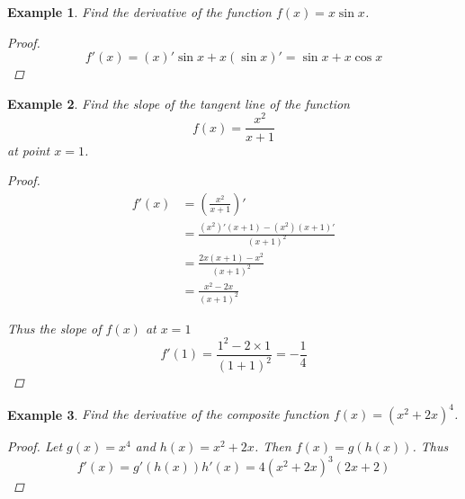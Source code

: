\documentclass{article}
\newtheorem{ex}{Example}
\begin{document}
\begin{ex}
	Find the derivative of the function $f(x) = x\sin x$.
	
	\begin{proof}
		\[ f'(x) = (x)'\sin x + x(\sin x)' = \sin x + x\cos x \]
	\end{proof}
\end{ex}

\begin{ex}
	Find the slope of the tangent line of the function 
	\[ f(x) = \frac{x^2}{x+1} \]
	at point $x=1$.
	
	\begin{proof}
		\begin{align*}
		f'(x) &= \left(\frac{x^2}{x+1}\right)'\\
		&= \frac{(x^2)'(x+1)-(x^2)(x+1)'}{(x+1)^2}\\
		&= \frac{2x(x+1)-x^2}{(x+1)^2}\\
		&= \frac{x^2 - 2x}{(x+1)^2}
		\end{align*}
		
		Thus the slope of $f(x)$ at $x=1$
		\[ f'(1) = \frac{1^2 -2\times1}{(1+1)^2} = -\frac{1}{4} \]
	\end{proof}	
\end{ex}


\begin{ex}
	Find the derivative of the composite function $f(x) = (x^2+2x)^4$.
	\begin{proof}
		Let $g(x) = x^4$ and $h(x)= x^2+2x$. Then $f(x) = g(h(x))$. Thus
		\[ f'(x) = g'(h(x))h'(x) = 4(x^2+2x)^3(2x+2)  \]
	\end{proof}
\end{ex}
\end{document}
